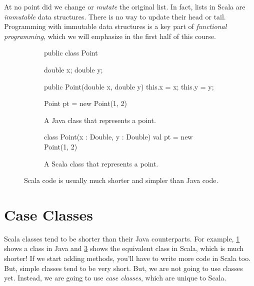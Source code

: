 \documentclass{book}
\begin{document}
At no point did we change or \emph{mutate} the original list. In fact, lists in
Scala are \emph{immutable} data structures. There is no way to update their
head or tail. Programming with immutable data structures is a key part of
\emph{functional programming}, which we will emphasize in the first half
of this course.

\begin{figure}
\begin{subfigure}[b]{.45\textwidth}
\begin{javacode}
public class Point {

  double x;
  double y;

  public Point(double x, double y) {
    this.x = x;
    this.y = y;
  }

}

Point pt = new Point(1, 2)
\end{javacode}
\caption{A Java class that represents a point.}\label{javapoint}
\end{subfigure}
\quad\vrule\quad
%
\begin{subfigure}[b]{.45\textwidth}
\begin{scalacode}
class Point(x : Double, y : Double)
val pt = new Point(1, 2)
\end{scalacode}
\caption{A Scala class that represents a point.}\label{scalapoint}
\end{subfigure}
\caption{Scala code is usually much shorter and simpler than Java code.}
\end{figure}

\section{Case Classes}

Scala classes tend to be shorter than their
Java counterparts. For example, \cref{javapoint} shows a  class
in Java and \cref{scalapoint} shows the equivalent class in Scala, which
is much shorter!
If we start adding methods, you'll have to write
more code in Scala too. But, simple classes tend to be very short.
But, we are not going to use classes yet. Instead, we are going to use
\emph{case classes}, which are unique to Scala.
\end{document}
